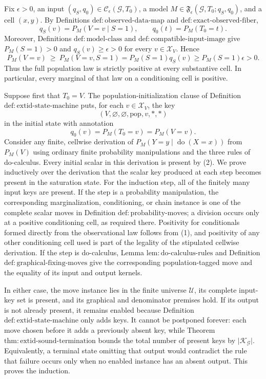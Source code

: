 Fix \(\epsilon>0\), an input \((q_S,q_0)\in\mathcal C_{\epsilon}(\mathcal G,T_0)\), a model \(M\in\mathfrak F_{\epsilon}(\mathcal G,T_0;q_S,q_0)\), and a cell \((x,y)\).  By Definitions \(\mathrm{def{:}observed\text{-}data\text{-}map}\) and \(\mathrm{def{:}exact\text{-}observed\text{-}fiber}\),
\[
q_S(v)=P_M(V=v\mid S=1),\qquad q_0(t)=P_M(T_0=t).
\]
Moreover, Definitions \(\mathrm{def{:}model\text{-}class}\) and \(\mathrm{def{:}compatible\text{-}input\text{-}image}\) give \(P_M(S=1)>0\) and \(q_S(v)\geq\epsilon>0\) for every \(v\in\mathcal X_V\).  Hence
\[
P_M(V=v)\ \geq\ P_M(V=v,S=1)
=P_M(S=1)q_S(v)
\geq P_M(S=1)\epsilon>0. \tag{1}
\]
Thus the full population law is strictly positive at every substantive cell.  In particular, every marginal of that law on a conditioning cell is positive.

Suppose first that \(T_0=V\).  The population-initialization clause of Definition \(\mathrm{def{:}extid\text{-}state\text{-}machine}\) puts, for each \(v\in\mathcal X_V\), the key
\[
 (V,\varnothing,\varnothing,\mathrm{pop},v,\ast,\ast)
\]
in the initial state with annotation
\[
q_0(v)=P_M(T_0=v)=P_M(V=v). \tag{2}
\]
Consider any finite, cellwise derivation of \(P_M(Y=y\mid\operatorname{do}(X=x))\) from \(P_M(V)\) using ordinary finite probability manipulations and the three rules of do-calculus.  Every initial scalar in this derivation is present by (2).  We prove inductively over the derivation that the scalar key produced at each step becomes present in the saturation state.  For the induction step, all of the finitely many input keys are present.  If the step is a probability manipulation, the corresponding marginalization, conditioning, or chain instance is one of the complete scalar moves in Definition \(\mathrm{def{:}probability\text{-}moves}\); a division occurs only at a positive conditioning cell, as required there.  Positivity for conditionals formed directly from the observational law follows from (1), and positivity of any other conditioning cell used is part of the legality of the stipulated cellwise derivation.  If the step is do-calculus, Lemma \(\mathrm{lem{:}do\text{-}calculus\text{-}rules}\) and Definition \(\mathrm{def{:}graphical\text{-}fixing\text{-}moves}\) give the corresponding population-tagged move and the equality of its input and output kernels.

In either case, the move instance lies in the finite universe \(\mathscr U\), its complete input-key set is present, and its graphical and denominator premises hold.  If its output is not already present, it remains enabled because Definition \(\mathrm{def{:}extid\text{-}state\text{-}machine}\) only adds keys.  It cannot be postponed forever: each move chosen before it adds a previously absent key, while Theorem \(\mathrm{thm{:}extid\text{-}sound\text{-}termination}\) bounds the total number of present keys by \(\lvert\mathscr K_{\mathcal G}\rvert\).  Equivalently, a terminal state omitting that output would contradict the rule that failure occurs only when no enabled instance has an absent output.  This proves the induction.

